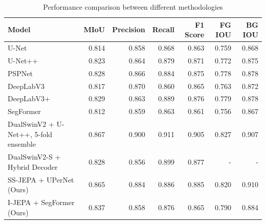 \begin{table}\centering\scriptsize
	\begin{tabular}{lrrrrrr}\toprule
		\textbf{Model}                                                                                    & \textbf{MIoU} & \textbf{Precision } & \textbf{Recall} & \textbf{F1 Score} & \textbf{FG IOU} & \textbf{BG IOU} \\
		\midrule
		U-Net~\cite{ronneberger2015unet}                                                                  & 0.814         & 0.858               & 0.868           & 0.863             & 0.759           & 0.868           \\
		U-Net++~\cite{zhou2019unetplusplus}                                                               & 0.823         & 0.864               & 0.879           & 0.871             & 0.772           & 0.875           \\
		PSPNet~\cite{zhao2017pyramidsceneparsingnetwork}                                                  & 0.828         & 0.866               & 0.884           & 0.875             & 0.778           & 0.878           \\
		DeepLabV3~\cite{chen2017deeplabsemanticimagesegmentation}                                         & 0.817         & 0.870               & 0.860           & 0.865             & 0.763           & 0.872           \\
		DeepLabV3+~\cite{DBLP:journals/corr/abs-1802-02611}                                               & 0.829         & 0.863               & 0.889           & 0.876             & 0.779           & 0.878           \\
		SegFormer~\cite{xie2021segformer}                                                                 & 0.812         & 0.859               & 0.863           & 0.861             & 0.756           & 0.867           \\
		DualSwinV2 + U-Net++, 5-fold ensemble~\cite{kabir2026dualswinfusionsegmultimodalmartianlandslide} & 0.867         & 0.900               & 0.911           & 0.905             & 0.827           & 0.907           \\
		DualSwinV2-S + Hybrid Decoder~\cite{kabir2026dualswinfusionsegmultimodalmartianlandslide}         & 0.828         & 0.856               & 0.899           & 0.877             & -               & -               \\
		SS-JEPA + UPerNet (Ours)                                                                          & 0.865         & 0.884               & 0.886           & 0.885             & 0.820           & 0.910           \\
		I-JEPA + SegFormer (Ours)                                                                         & 0.837         & 0.858               & 0.876           & 0.865             & 0.790           & 0.884           \\
		\bottomrule
	\end{tabular}
	\vspace{0.5em}
	\caption{Performance comparison between different methodologies}\label{tab:all-vs-ours}
	
\end{table}

